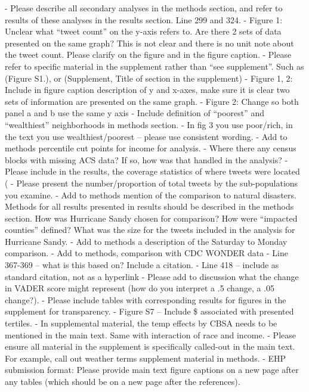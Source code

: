 - Please describe all secondary analyses in the methods section, and refer to results of these analyses in the results section. Line 299 and 324.
- Figure 1: Unclear what “tweet count” on the y-axis refers to. Are there 2 sets of data presented on the same graph? This is not clear and there is no unit note about the tweet count. Please clarify on the figure and in the figure caption.
- Please refer to specific material in the supplement rather than “see supplement”. Such as (Figure S1.), or (Supplement, Title of section in the supplement)
- Figure 1, 2: Include in figure caption description of y and x-axes, make sure it is clear two sets of information are presented on the same graph.
- Figure 2: Change so both panel a and b use the same y axis
- Include definition of “poorest” and “wealthiest” neighborhoods in methods section.
- In fig 3 you use poor/rich, in the text you use wealthiest/poorest – please use consistent wording.
- Add to methods percentile cut points for income for analysis.
- Where there any census blocks with missing ACS data? If so, how was that handled in the analysis?
- Please include in the results, the coverage statistics of where tweets were located (%
- Please present the number/proportion of total tweets by the sub-populations you examine.
- Add to methods mention of the comparison to natural disasters. Methods for all results presented in results should be described in the methods section. How was Hurricane Sandy chosen for comparison? How were “impacted counties” defined? What was the size for the tweets included in the analysis for Hurricane Sandy.
- Add to methods a description of the Saturday to Monday comparison.
- Add to methods, comparison with CDC WONDER data
- Line 367-369 – what is this based on? Include a citation.
- Line 418 – include as standard citation, not as a hyperlink
- Please add to discussion what the change in VADER score might represent (how do you interpret a .5 change, a .05 change?).
- Please include tables with corresponding results for figures in the supplement for transparency.
- Figure S7 – Include \$ associated with presented tertiles.
- In supplemental material, the temp effects by CBSA needs to be mentioned in the main text. Same with interaction of race and income.
- Please ensure all material in the supplement is specifically called-out in the main text. For example,
call out weather terms supplement material in methods.
- EHP submission format: Please provide main text figure captions on a new page after any tables (which should be on a new page after the references).
